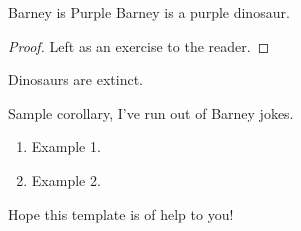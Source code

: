 \documentclass[../AAL-Notes.tex]{subfiles}
\begin{document}
\begin{proposition}{Barney is Purple}{}
Barney is a purple dinosaur. 
\end{proposition}
\begin{proof}
Left as an exercise to the reader. 
\end{proof}
 
 
\begin{lemma}{}{}
Dinosaurs are extinct. 
\end{lemma}

\begin{corollary}{}{}
Sample corollary, I've run out of Barney jokes. 
\end{corollary}

\begin{example}{}{}
\begin{enumerate}
  \item Example 1. 
  \item Example 2. 
\end{enumerate}
\end{example}


\begin{theorem}{}{}
Hope this template is of help to you! 
\end{theorem}
 
\end{document}
